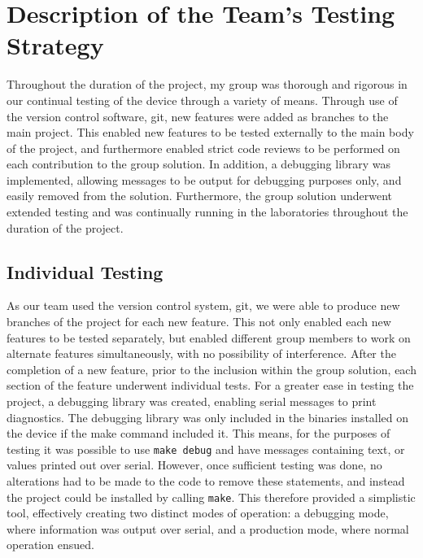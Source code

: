 \section{Description of the Team's Testing Strategy}

Throughout the duration of the project, my group was thorough and rigorous in our 
continual testing of the device through a variety of means. Through use of the 
version control software, git, new features were added as branches to the main
project. This enabled new features to be tested externally to the main body of 
the project, and furthermore enabled strict code reviews to be performed on each 
contribution to the group solution. 
In addition, a debugging library was implemented, allowing messages to be 
output for debugging purposes only, and easily removed from the solution. 
Furthermore, the group solution underwent extended testing and was continually 
running in the laboratories throughout the duration of the project. 

\subsection*{Individual Testing}

As our team used the version control system, git, we were able to produce new 
branches of the project for each new feature. 
This not only enabled each new features to be tested separately, but enabled 
different group members to work on alternate features simultaneously, with no 
possibility of interference. 
After the completion of a new feature, prior to the inclusion within the group 
solution, each section of the feature underwent individual tests. 
For a greater ease in testing the project,  a debugging library was created, 
enabling serial messages to print diagnostics. 
The debugging library was only included in the 
binaries installed on the device if the make command included it. This 
means, for the purposes of testing it was possible to use \texttt{make debug} 
and have messages containing text, or values printed out over serial. 
However, once sufficient testing was done, no 
alterations had to be made to the code to remove these statements, and 
instead the project could be installed by calling \texttt{make}. 
This therefore provided a simplistic tool, effectively creating two distinct 
modes of operation: a debugging mode, where information was output over serial, 
and a production mode, where normal operation ensued. 

